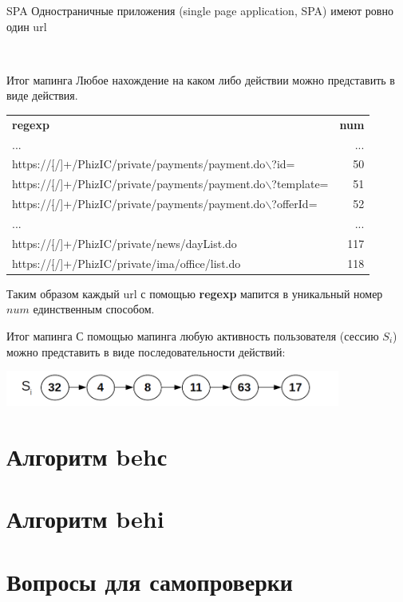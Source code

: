 \begin{frame}{SPA}
	Одностраничные приложения (single page application, SPA)
	имеют ровно один url
	
\end{frame}

\

\begin{frame}{Итог мапинга}
	\small
	Любое нахождение на каком либо действии можно представить в виде действия.
	
	\begin{tabular}{lr}
		\textbf{regexp} & \textbf{num} \\
		... & ... \\
		https://[$\hat{}$/]+/PhizIC/private/payments/payment.do$\backslash$?id= & 50 \\
		https://[$\hat{}$/]+/PhizIC/private/payments/payment.do$\backslash$?template= & 51 \\
		https://[$\hat{}$/]+/PhizIC/private/payments/payment.do$\backslash$?offerId= & 52 \\
		... & ... \\
		https://[$\hat{}$/]+/PhizIC/private/news/dayList.do & 117 \\
		https://[$\hat{}$/]+/PhizIC/private/ima/office/list.do & 118 \\
	\end{tabular}
	
	Таким образом каждый url с помощью \textbf{regexp} мапится в уникальный 
	номер $num$ единственным способом. 
\end{frame}

\begin{frame}{Итог мапинга}
	С помощью мапинга любую  активность пользователя (сессию $S_i$)
	можно представить в виде последовательности
	действий:
	
	\begin{center}
		\includegraphics[width=11cm]{../pic/beh/chain.png}\centering
	\end{center}
\end{frame}

\section{Алгоритм behс}\label{section:behс}


\section{Алгоритм behi}\label{section:behi}


\section{Вопросы для самопроверки}

